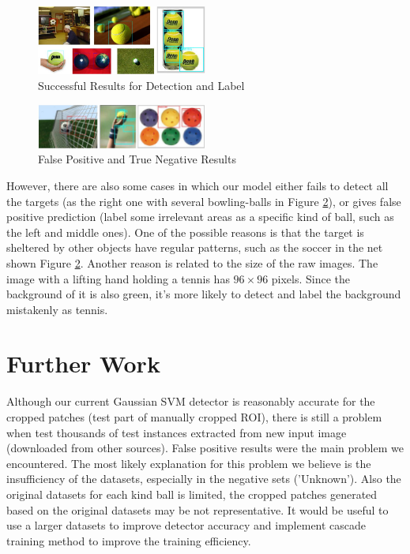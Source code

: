 \documentclass{article}
\begin{document}
\begin{figure}[htb]
\centering
\includegraphics[width=0.5\textwidth]{successfulResult.jpg}
\caption{Successful Results for Detection and Label}
\label{fig:succefulResult}
\end{figure}

\begin{figure}[htp]
\centering
\includegraphics[width=0.5\textwidth]{failedResult.jpg}
\caption{False Positive and True Negative Results}
\label{fig:failedResult}
\end{figure}

However, there are also some cases in which our model either fails to detect all the targets (as the right one with several bowling-balls in Figure \ref{fig:failedResult}), or gives false positive prediction (label some irrelevant areas as a specific kind of ball, such as the left and middle ones). One of the possible reasons is that the target is sheltered by other objects have regular patterns, such as the soccer in the net shown Figure \ref{fig:failedResult}. Another reason is related to the size of the raw images. The image with a lifting hand holding a tennis has $96\times96$ pixels. Since the background of it is also green, it's more likely to detect and label the background mistakenly as tennis.


\section{Further Work} 
Although our current Gaussian SVM detector is reasonably accurate for the cropped patches (test part of manually cropped ROI), there is still a problem when test thousands of test instances extracted from new input image (downloaded from other sources). False positive results were the main problem we encountered. The most likely explanation for this problem we believe is the insufficiency of the datasets, especially in the negative sets ('Unknown'). Also the original datasets for each kind ball is limited, the cropped patches generated based on the original datasets may be not representative. It would be useful to use a larger datasets to improve detector accuracy and implement cascade training method \cite{viola2001rapid} to improve the training efficiency.
\end{document}
